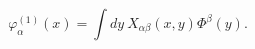 \begin{equation}
\label{ansatz} \varphi^{(1)}_\alpha(x)=\int dy~
X_{\alpha\beta}(x,y)\Phi^\beta(y).
\end{equation}

